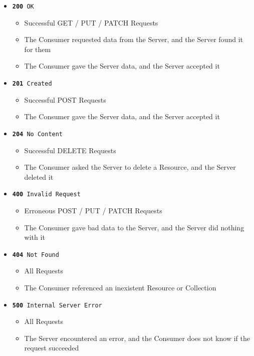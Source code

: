 \documentclass{book}
\begin{document}
\begin{itemize}
\item \texttt{\textbf{200} OK}
    \begin{itemize}
    \item Successful GET / PUT / PATCH  Requests
    \item The Consumer requested data from the Server, and the Server found it for them
    \item The Consumer gave the Server data, and the Server accepted it
    \end{itemize}
\item \texttt{\textbf{201} Created}
    \begin{itemize}
    \item Successful POST Requests
    \item The Consumer gave the Server data, and the Server accepted it
    \end{itemize}
\item \texttt{\textbf{204} No Content}
    \begin{itemize}
    \item Successful DELETE Requests
    \item The Consumer asked the Server to delete a Resource, and the Server deleted it
    \end{itemize}
\item \texttt{\textbf{400} Invalid Request}
    \begin{itemize}
    \item Erroneous POST / PUT / PATCH Requests
    \item The Consumer gave bad data to the Server, and the Server did nothing with it
    \end{itemize}
\item \texttt{\textbf{404} Not Found}
    \begin{itemize}
    \item All Requests
    \item The Consumer referenced an inexistent Resource or Collection
    \end{itemize}
\item \texttt{\textbf{500} Internal Server Error}
    \begin{itemize}
    \item All Requests
    \item The Server encountered an error, and the Consumer does not know if the request succeeded
    \end{itemize}
\end{itemize}
\end{document}
